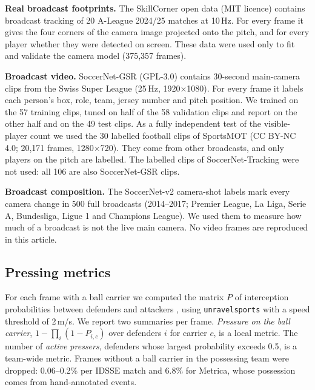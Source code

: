 \documentclass[11pt]{article}
\begin{document}
\textbf{Real broadcast footprints.} The SkillCorner open data \citep{skillcorner_opendata} (MIT licence) contains
broadcast tracking of 20 A-League 2024/25 matches at 10\,Hz. For every frame it gives the four corners of the camera
image projected onto the pitch, and for every player whether they were detected on screen. These data were used only
to fit and validate the camera model (375{,}357 frames).

\textbf{Broadcast video.} SoccerNet-GSR \citep{somers2024gsr} (GPL-3.0) contains 30-second main-camera clips from the
Swiss Super League (25\,Hz, 1920$\times$1080). For every frame it labels each person's box, role, team, jersey number
and pitch position. We trained on the 57 training clips, tuned on half of the 58 validation clips and report on the
other half and on the 49 test clips. As a fully independent test of the visible-player count we used the 30 labelled
football clips of SportsMOT \citep{cui2023sportsmot} (CC BY-NC 4.0; 20{,}171 frames, 1280$\times$720). They come
from other broadcasts, and only players on the pitch are labelled. The labelled clips of SoccerNet-Tracking were not
used: all 106 are also SoccerNet-GSR clips.

\textbf{Broadcast composition.} The SoccerNet-v2 camera-shot labels \citep{deliege2021soccernetv2} mark every camera
change in 500 full broadcasts (2014--2017; Premier League, La Liga, Serie A, Bundesliga, Ligue 1 and Champions
League). We used them to measure how much of a broadcast is not the live main camera. No video frames are reproduced
in this article.

\subsection{Pressing metrics}
For each frame with a ball carrier we computed the matrix $P$ of interception probabilities between defenders and
attackers \citep{bekkers2025pressing}, using \texttt{unravelsports} \citep{unravelsports} with a speed threshold of
2\,m/s. We report two summaries per frame. \emph{Pressure on the ball carrier}, $1 - \prod_i (1 - P_{i,c})$ over
defenders $i$ for carrier $c$, is a local metric. The number of \emph{active pressers}, defenders whose largest
probability exceeds 0.5, is a team-wide metric. Frames without a ball carrier in the possessing team were dropped:
0.06--0.2\% per IDSSE match and 6.8\% for Metrica, whose possession comes from hand-annotated events.
\end{document}
